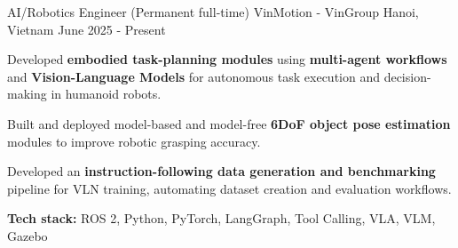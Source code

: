 
\begin{cventries}


  \cventry
    {AI/Robotics Engineer (Permanent full-time)}
    {VinMotion - VinGroup}
    {Hanoi, Vietnam}
    {June 2025 - Present}
    {
      \begin{cvitems}
        \item {Developed \textbf{embodied task-planning modules} using \textbf{multi-agent workflows} and \textbf{Vision-Language Models} for autonomous task execution and decision-making in humanoid robots.}
        \item {Built and deployed model-based and model-free \textbf{6DoF object pose estimation} modules to improve robotic grasping accuracy.}
        \item {Developed an \textbf{instruction-following data generation and benchmarking} pipeline for VLN training, automating dataset creation and evaluation workflows.}
        \item {\textbf{Tech stack:} ROS 2, Python, PyTorch, LangGraph, Tool Calling, VLA, VLM, Gazebo}
      \end{cvitems}
    }


\end{cventries}
